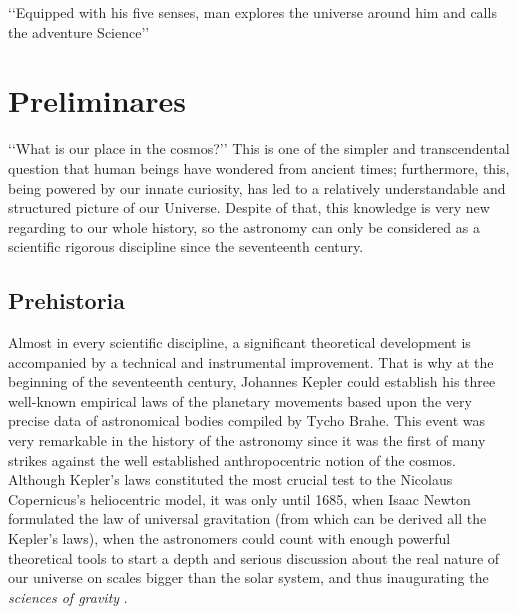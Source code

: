 \begin{savequote}[50mm]
‘‘Equipped with his five senses, man explores the universe around him and 
calls the adventure Science’’
\end{savequote}




\chapter{Preliminares}
\label{cha:Introduction}


‘‘What is our place in the cosmos?’’ This is one of the simpler and 
trans\-cendental question that human beings have wondered from ancient 
times; furthermore, this, being powered by our innate curiosity, has led to 
a relatively understandable and structured picture of our Universe. Despite 
of that, this knowledge is very new regarding to our whole history, so the 
astronomy can only be considered as a scientific rigorous discipline since 
the seventeenth century.







\section{Prehistoria}
\label{sec:Prehistory}


Almost in every scientific discipline, a significant theoretical development 
is accompanied by a technical and instrumental improvement. That is why at 
the beginning of the seventeenth century, Johannes Kepler could establish 
his three well-known empirical laws of the planetary movements based upon 
the very precise data of astronomical bodies compiled by Tycho Brahe. This 
event was very remarkable in the history of the astronomy since it was the 
first of many strikes against the well established anthropocentric notion 
of the cosmos. Although Kepler's laws constituted the most crucial test to 
the Nicolaus Copernicus's heliocentric model, it was only until 1685, when 
Isaac Newton formulated the law of universal gravitation (from which can be 
derived all the Kepler's laws), when the astronomers could count with 
enough powerful theoretical tools to start a depth and serious discussion 
about the real nature of our universe on scales bigger than the solar 
system, and thus inaugurating the \textit{sciences of gravity} 
\cite{longair2008}.


